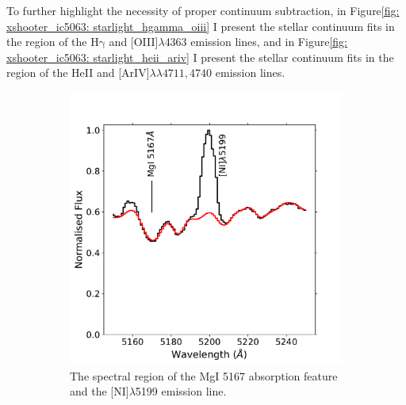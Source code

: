 To further highlight the necessity of proper continuum subtraction, in Figure\;\ref{fig: xshooter_ic5063: starlight_hgamma_oiii} I present the stellar continuum fits in the region of the H$\mathrm{\gamma}$ and [OIII]$\lambda$4363 emission lines, and in Figure\;\ref{fig: xshooter_ic5063: starlight_heii_ariv} I present the stellar continuum fits in the region of the HeII and [ArIV]$\lambda\lambda4711,4740$ emission lines.

\begin{figure}
    \begin{subfigure}[t]{0.47\textwidth}
        \includegraphics[width=\linewidth]{figures/xshooter_ic5063/starlight_mgi_ni.pdf}
        \caption{The spectral region of the MgI 5167\;{\AA} absorption feature and the [NI]$\lambda$5199 emission line.}
        \label{fig: xshooter_ic5063: starlight_mgi_ni}
    \end{subfigure}
    \hfill
    \begin{subfigure}[t]{0.47\textwidth}

\end{subfigure}
\end{figure}
